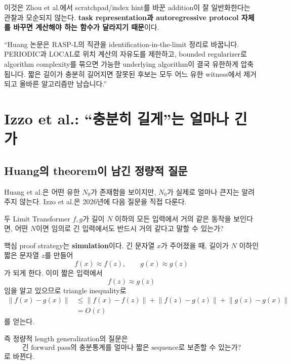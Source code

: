 \documentclass[11pt,a4paper,oneside,openany]{memoir}
\newcommand{\norm}[1]{\left\lVert #1\right\rVert}
\theoremstyle{definition}
\begin{document}
이것은 Zhou et al.에서 scratchpad/index hint를 바꾼 addition이 잘 일반화한다는 관찰과 모순되지 않는다.
\textbf{task representation과 autoregressive protocol 자체를 바꾸면 계산해야 하는 함수가 달라지기 때문}이다.

\begin{presentbox}
``Huang 논문은 RASP-L의 직관을 identification-in-the-limit 정리로 바꿉니다. PERIODIC과 LOCAL로 위치 계산의 자유도를 제한하고, bounded regularizer로 algorithm complexity를 묶으면 가능한 underlying algorithm이 결국 유한하게 압축됩니다. 짧은 길이가 충분히 길어지면 잘못된 후보는 모두 어느 유한 witness에서 제거되고 올바른 알고리즘만 남습니다.''
\end{presentbox}

\chapter{Izzo et al.: ``충분히 길게''는 얼마나 긴가}

\section{Huang의 theorem이 남긴 정량적 질문}

Huang et al.은 어떤 유한 $N_0$가 존재함을 보이지만, $N_0$가 실제로 얼마나 큰지는 알려 주지 않는다.
Izzo et al.은 2026년에 다음 질문을 직접 다룬다.

\begin{keybox}
두 Limit Transformer $f,g$가 길이 $N$ 이하의 모든 입력에서 거의 같은 동작을 보인다면,
어떤 $N$이면 임의로 긴 입력에서도 반드시 거의 같다고 말할 수 있는가?
\end{keybox}

핵심 proof strategy는 \textbf{simulation}이다.
긴 문자열 $x$가 주어졌을 때, 길이가 $N$ 이하인 짧은 문자열 $z$를 만들어
\[
f(x)\approx f(z),
\qquad
g(x)\approx g(z)
\]
가 되게 한다. 이미 짧은 입력에서
\[
f(z)\approx g(z)
\]
임을 알고 있으므로 triangle inequality로
\[
\begin{aligned}
\norm{f(x)-g(x)}
&\le \norm{f(x)-f(z)}
+\norm{f(z)-g(z)}
+\norm{g(z)-g(x)}\\
&=O(\varepsilon)
\end{aligned}
\]
를 얻는다.

즉 정량적 length generalization의 질문은
\[
\boxed{\text{긴 forward pass의 충분통계를 얼마나 짧은 sequence로 보존할 수 있는가?}}
\]
로 바뀐다.
\end{document}
